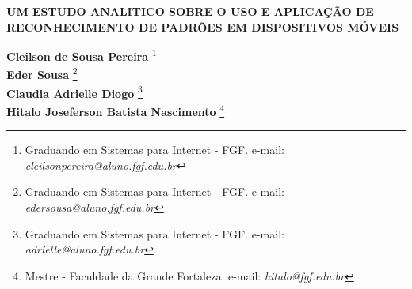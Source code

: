 \documentclass[12pt]{article}
\begin{document}

%



\begin{center}
\textbf{\Large{UM ESTUDO ANALITICO SOBRE O USO E APLICAÇÃO DE RECONHECIMENTO DE PADRÕES EM DISPOSITIVOS MÓVEIS}}\\
\end{center}

\vspace*{0.2cm}

\begin{flushright}
 {\bf Cleilson de Sousa Pereira} \footnote[1]{Graduando em Sistemas para Internet - FGF. e-mail: \it cleilsonpereira@aluno.fgf.edu.br}  \\
 {\bf Eder Sousa} \footnote[2]{Graduando em Sistemas para Internet - FGF. e-mail: \it edersousa@aluno.fgf.edu.br}  \\
  {\bf Claudia Adrielle Diogo} \footnote[3]{Graduando em Sistemas para Internet - FGF. e-mail: \it adrielle@aluno.fgf.edu.br}  \\
   {\bf Hitalo Joseferson Batista Nascimento} \footnote[4]{Mestre - Faculdade da Grande Fortaleza. e-mail: \it hitalo@fgf.edu.br}   \\
\end{flushright}

\vspace*{0.5cm}

\end{document}
